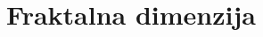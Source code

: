 \documentclass[11pt, a4paper]{article}
\begin{document}
\title{Fraktalna dimenzija}
\maketitle


\newpage

\end{document}
